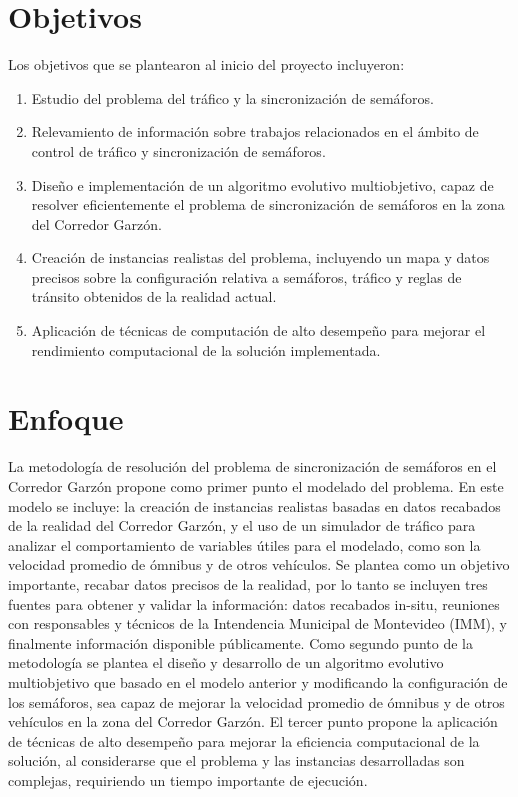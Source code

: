 \section{Objetivos}

Los objetivos que se plantearon al inicio del proyecto incluyeron:

\begin{enumerate}
	\item Estudio del problema del tráfico y la sincronización de semáforos.
	\item Relevamiento de información sobre trabajos relacionados en el ámbito de control de tráfico y sincronización de semáforos.
	\item Diseño e implementación de un algoritmo evolutivo multiobjetivo, capaz de resolver eficientemente el problema de sincronización de semáforos en la zona del Corredor Garzón.
	\item Creación de instancias realistas del problema, incluyendo un mapa y datos precisos sobre la configuración relativa a semáforos, tráfico y reglas de tránsito obtenidos de la realidad actual.	
	\item Aplicación de técnicas de computación de alto desempeño para mejorar el rendimiento computacional de la solución implementada.

\end{enumerate}

 
\section{Enfoque}

La metodología de resolución del problema de sincronización de semáforos en el Corredor Garzón propone como primer punto el modelado del problema. En este modelo se incluye: la creación de instancias realistas basadas en datos recabados de la realidad del Corredor Garzón, y el uso de un simulador de tráfico para analizar el comportamiento de variables útiles para el modelado, como son la velocidad promedio de ómnibus y de otros vehículos. Se plantea como un objetivo importante, recabar datos precisos de la realidad, por lo tanto se incluyen tres fuentes para obtener y validar la información: datos recabados in-situ, reuniones con responsables y técnicos de la Intendencia Municipal de Montevideo (IMM), y finalmente información disponible públicamente.
Como segundo punto de la metodología se plantea el diseño y desarrollo de un algoritmo evolutivo multiobjetivo que basado en el modelo anterior y modificando la configuración de los semáforos, sea capaz de mejorar la velocidad promedio de ómnibus y de otros vehículos en la zona del Corredor Garzón. 
El tercer punto propone la aplicación de técnicas de alto desempeño para mejorar la eficiencia computacional de la solución, al considerarse que el problema y las instancias desarrolladas son complejas, requiriendo un tiempo importante de ejecución.



